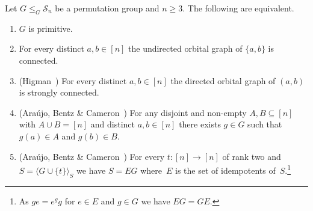 \begin{theorem}
\label{sync_max:thm:prim_orbitals}
Let $G \le_G \mathcal S_n$ be a permutation group and $n \ge 3$. 
The following are equivalent.


\begin{enumerate}
\item \label{sync_max:thm:prim_char:prim}  
$G$ is primitive.

\item \label{sync_max:thm:prim_char:higman} For every distinct $a,b \in [n]$ the 
undirected orbital graph of $\{ a,b \}$ is connected. 

\item \label{sync_max:thm:prim_char:higman-directed} (Higman~\cite[(1.12)]{HIGMAN196722}) For every distinct $a,b \in [n]$ the 
directed orbital graph of $(a,b)$ is strongly connected.

\item \label{sync_max:thm:prim_char:partition} (Ara\'ujo, Bentz \& Cameron~\cite[Prop.~2.2]{ARAUJO2021a})
For any disjoint and non-empty $A,B \subseteq [n]$ with $A \cup B = [n]$
and distinct $a,b \in [n]$ there exists $g \in G$
such that $g(a) \in A$ and $g(b) \in B$.

\item \label{sync_max:thm:prim_char2:strongly_factorizable}  (Ara\'ujo, Bentz \& Cameron~\cite[Thm.~1.1]{ARAUJO2021a})
For every $t \colon [n] \to [n]$ of rank two
and $S = \langle G \cup \{t\} \rangle_S$
we have $S = EG$ where~$E$ is the set of idempotents
of~$S$.\footnote{As $ge = e^gg$ for $e \in E$ and $g \in G$ we have $EG = GE$.}
\end{enumerate}	
\end{theorem}
